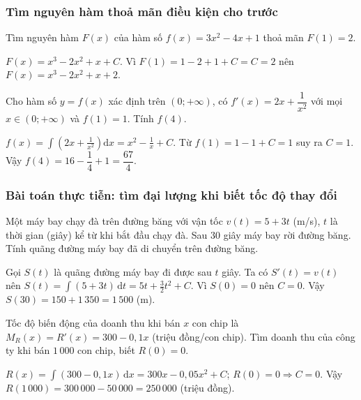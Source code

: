\subsubsection{Tìm nguyên hàm thoả mãn điều kiện cho trước}
\begin{vidu}
Tìm nguyên hàm $F(x)$ của hàm số $f(x)=3x^2-4x+1$ thoả mãn $F(1)=2$.
\begin{loigiai}
$F(x)=x^3-2x^2+x+C$. Vì $F(1)=1-2+1+C=C=2$ nên $F(x)=x^3-2x^2+x+2$.
\end{loigiai}
\end{vidu}

\begin{vidu}
Cho hàm số $y=f(x)$ xác định trên $(0;+\infty)$, có $f'(x)=2x+\dfrac1{x^2}$ với mọi $x\in(0;+\infty)$ và $f(1)=1$. Tính $f(4)$.
\begin{loigiai}
$f(x)=\displaystyle\int\left(2x+\frac1{x^2}\right)\mathrm dx=x^2-\frac1x+C$. Từ $f(1)=1-1+C=1$ suy ra $C=1$. Vậy $f(4)=16-\dfrac14+1=\dfrac{67}4$.
\end{loigiai}
\end{vidu}

\subsubsection{Bài toán thực tiễn: tìm đại lượng khi biết tốc độ thay đổi}
\begin{vidu}
Một máy bay chạy đà trên đường băng với vận tốc $v(t)=5+3t$ (m/s), $t$ là thời gian (giây) kể từ khi bắt đầu chạy đà. Sau $30$ giây máy bay rời đường băng. Tính quãng đường máy bay đã di chuyển trên đường băng.
\begin{loigiai}
Gọi $S(t)$ là quãng đường máy bay đi được sau $t$ giây. Ta có $S'(t)=v(t)$ nên $S(t)=\displaystyle\int(5+3t)\,\mathrm dt=5t+\frac32t^2+C$. Vì $S(0)=0$ nên $C=0$. Vậy $S(30)=150+1\,350=1\,500$ (m).
\end{loigiai}
\end{vidu}

\begin{vidu}
Tốc độ biến động của doanh thu khi bán $x$ con chip là $M_R(x)=R'(x)=300-0{,}1x$ (triệu đồng/con chip). Tìm doanh thu của công ty khi bán $1\,000$ con chip, biết $R(0)=0$.
\begin{loigiai}
$R(x)=\displaystyle\int(300-0{,}1x)\,\mathrm dx=300x-0{,}05x^2+C$; $R(0)=0\Rightarrow C=0$. Vậy $R(1\,000)=300\,000-50\,000=250\,000$ (triệu đồng).
\end{loigiai}
\end{vidu}

